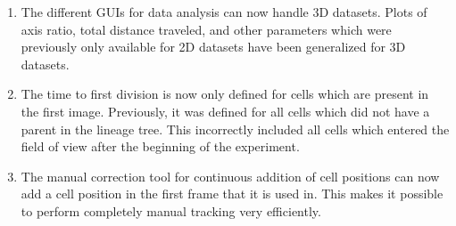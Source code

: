 \documentclass[a4paper, oneside, onecolumn, 11pt]{article}
\begin{document}
\begin{enumerate}
\item The different GUIs for data analysis can now handle 3D datasets. Plots of axis ratio, total distance traveled, and other parameters which were previously only available for 2D datasets have been generalized for 3D datasets.
\item The time to first division is now only defined for cells which are present in the first image. Previously, it was defined for all cells which did not have a parent in the lineage tree. This incorrectly included all cells which entered the field of view after the beginning of the experiment.
\item The manual correction tool for continuous addition of cell positions can now add a cell position in the first frame that it is used in. This makes it possible to perform completely manual tracking very efficiently.
\end{enumerate}
\end{document}
